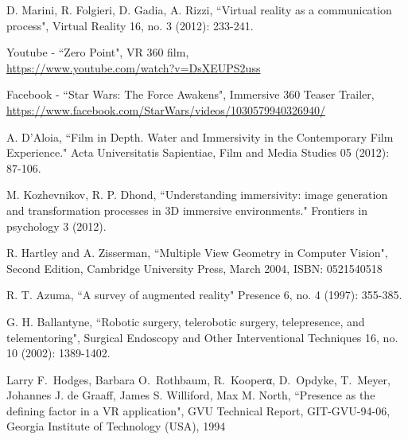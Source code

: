 

\begin{thebibliography}{99} %

D. Marini, R. Folgieri, D. Gadia, A. Rizzi,
``Virtual reality as a communication process", Virtual Reality 16, no. 3 (2012): 233-241.


Youtube - ``Zero Point", VR 360 film, \\ \href{https://www.youtube.com/watch?v=DsXEUPS2uss}{https://www.youtube.com/watch?v=DsXEUPS2uss}

Facebook - ``Star Wars: The Force Awakens", Immersive 360 Teaser Trailer, \\ \href{https://www.facebook.com/StarWars/videos/1030579940326940/}{https://www.facebook.com/StarWars/videos/1030579940326940/}


A. D’Aloia,
``Film in Depth. Water and Immersivity in the Contemporary Film Experience." Acta Universitatis Sapientiae, Film and Media Studies 05 (2012): 87-106.

M. Kozhevnikov, R. P. Dhond,
``Understanding immersivity: image generation and transformation processes in 3D immersive environments." Frontiers in psychology 3 (2012).

R. Hartley and A. Zisserman,
``Multiple View Geometry in Computer Vision", Second Edition, Cambridge University Press, March 2004,
ISBN: 0521540518

 R. T. Azuma,
``A survey of augmented reality" Presence 6, no. 4 (1997): 355-385.

G. H. Ballantyne,
``Robotic surgery, telerobotic surgery, telepresence, and telementoring", Surgical Endoscopy and Other Interventional Techniques 16, no. 10 (2002): 1389-1402.


Larry F.~Hodges, Barbara O.~Rothbaum, R.~Kooperα,
D.~Opdyke, T.~Meyer, Johannes J. de Graaff,
James S. Williford, Max M. North,
``Presence as the defining factor in a VR application",
GVU Technical Report, GIT-GVU-94-06,
Georgia Institute of Technology (USA), 1994



\end{thebibliography}
